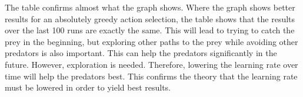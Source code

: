 The table confirms almost what the graph shows. Where the graph shows better results for an absolutely greedy action selection, the table shows that the results over the last 100 runs are exactly the same.  This will lead to trying to catch the prey in the beginning, but exploring other paths to the prey while avoiding other predators is also important. This can help the predators significantly in the future. However, exploration is needed. Therefore, lowering the learning rate over time will help the predators best. This confirms the theory that the learning rate must be lowered in order to yield best results.